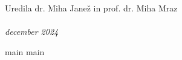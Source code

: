 \documentclass[graybox, envcountchap]{svmult}
\begin{document}
\large Uredila dr. Miha Janež in prof. dr. Miha Mraz\\
\\
\normalsize \emph{december 2024}




%
%
%


\tableofcontents
%
%


%
{main}
{main}

%

%
%



\backmatter





\end{document}
